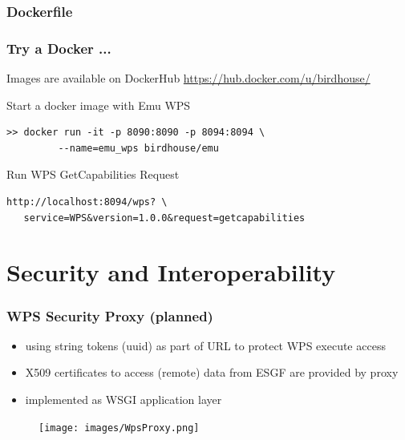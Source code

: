 \documentclass{beamer}
\begin{document}

  \begin{frame}
    \frametitle{Dockerfile}
    
\end{frame}


  \begin{frame}
    \frametitle{Try a Docker ...}
    \begin{block}{Images are available on DockerHub}
      \url{https://hub.docker.com/u/birdhouse/}
    \end{block}
    \begin{block}{Start a docker image with Emu WPS}
      \begin{verbatim}
>> docker run -it -p 8090:8090 -p 8094:8094 \
         --name=emu_wps birdhouse/emu  
      \end{verbatim}
    \end{block}
    \begin{block}{Run WPS GetCapabilities Request}
      \begin{verbatim}
http://localhost:8094/wps? \
   service=WPS&version=1.0.0&request=getcapabilities
      \end{verbatim}
    \end{block}
\end{frame}


  \section{Security and Interoperability}


  \begin{frame}[plain]
    \frametitle{WPS Security Proxy (planned)}
    \begin{itemize}
      \item using string tokens (uuid) as part of URL to protect WPS execute access
      \item X509 certificates to access (remote) data from ESGF are provided by proxy
      \item implemented as WSGI application layer
    \end{itemize}
    \begin{figure}
      \texttt{[image: images/WpsProxy.png]}
    \end{figure}
  \end{frame}
\end{document}

